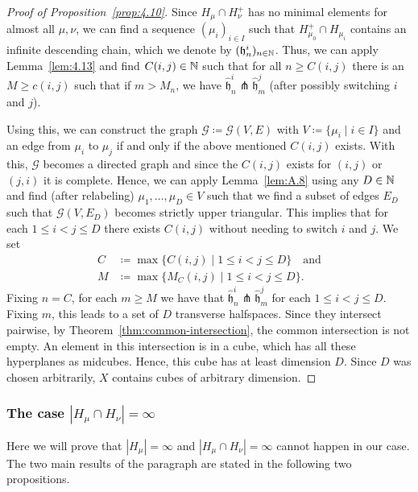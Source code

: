 \begin{proof}[Proof of Proposition~\ref{prop:4.10}]
  Since \(H_\mu \cap H_\nu^+\) has no minimal elements for almost all \(\mu, \nu\), we can find a sequence \((\mu_i)_{i \in I}\) such that \(H_{\mu_0}^+ \cap H_{\mu_i}\) contains an infinite descending chain, which we denote by \((\mathfrak{h}^i_n)_{n \in \mathbb{N}}\). Thus, we can apply Lemma~\ref{lem:4.13} and find \(C(i,j) \in \mathbb{N}\) such that for all \(n \geq C(i,j)\) there is an \(M \geq c(i,j)\) such that if \(m > M_n\), we have \(\mathfrak{\hat h}_n^i \pitchfork \mathfrak{\hat h}_m^j\) (after possibly switching \(i\) and \(j\)).

  Using this, we can construct the graph \(\mathcal{G} \coloneqq \mathcal{G}(V,E)\) with \(V \coloneqq \{\mu_i \mid i \in I\}\) and an edge from \(\mu_i\) to \(\mu_j\) if and only if the above mentioned \(C(i,j)\) exists. With this, \(\mathcal{G}\) becomes a directed graph and since the \(C(i,j)\) exists for \((i,j)\) or \((j,i)\) it is complete. Hence, we can apply Lemma~\ref{lem:A.8} using any \(D \in \mathbb{N}\) and find (after relabeling) \(\mu_1, \dots, \mu_D \in V\) such that we find a subset of edges \(E_D\) such that \(\mathcal{G}(V,E_D)\) becomes strictly upper triangular. This implies that for each \(1\leq i < j \leq D\) there exists \(C(i,j)\) without needing to switch \(i\) and \(j\). We set
  \begin{align*}
    C &\coloneqq \max\{C(i,j) \mid 1 \leq i < j \leq D\} \quad \text{and}\\
    M &\coloneqq \max\{M_C(i,j) \mid 1 \leq i < j \leq D\}.
  \end{align*}
  Fixing \(n = C\), for each \(m \geq M\) we have that \(\mathfrak{\hat h}_n^i \pitchfork \mathfrak{\hat h}_m^j\) for each \(1 \leq i < j \leq D\). Fixing \(m\), this leads to a set of \(D\) transverse halfspaces. Since they intersect pairwise,  by Theorem~\ref{thm:common-intersection}, the common intersection is not empty. An element in this intersection is in a cube, which has all these hyperplanes as midcubes. Hence, this cube has at least dimension \(D\). Since \(D\) was chosen arbitrarily, \(X\) contains cubes of arbitrary dimension.
\end{proof}

\subsubsection{The case \(|H_\mu \cap H_\nu| = \infty\)}
\label{sec:M=infty}

Here we will prove that \(|H_\mu| = \infty\) and \(|H_\mu \cap H_\nu| = \infty\) cannot happen in our case. The two main results of the paragraph are stated in the following two propositions.

